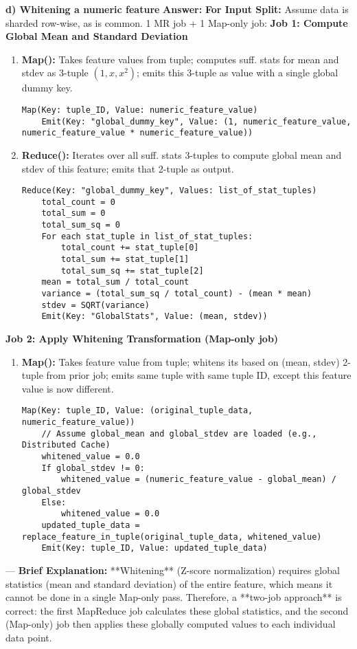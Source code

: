 \documentclass{article}
\begin{document}
\begin{enumerate}[label=\textbf{Question \arabic*.}]
  \textbf{d) Whitening a numeric feature}
    \textbf{Answer:}
    \textbf{For Input Split:} Assume data is sharded row-wise, as is common.
    1 MR job + 1 Map-only job:
    \textbf{Job 1: Compute Global Mean and Standard Deviation}
    \begin{enumerate}[label=(\alph*)]
    \item \textbf{Map():} Takes feature values from tuple; computes suff. stats for mean and stdev as 3-tuple $(1, x, x^2)$; emits this 3-tuple as value with a single global dummy key.
        \begin{lstlisting}
Map(Key: tuple_ID, Value: numeric_feature_value)
    Emit(Key: "global_dummy_key", Value: (1, numeric_feature_value, numeric_feature_value * numeric_feature_value))
        \end{lstlisting}
    \item \textbf{Reduce():} Iterates over all suff. stats 3-tuples to compute global mean and stdev of this feature; emits that 2-tuple as output.
        \begin{lstlisting}
Reduce(Key: "global_dummy_key", Values: list_of_stat_tuples)
    total_count = 0
    total_sum = 0
    total_sum_sq = 0
    For each stat_tuple in list_of_stat_tuples:
        total_count += stat_tuple[0]
        total_sum += stat_tuple[1]
        total_sum_sq += stat_tuple[2]
    mean = total_sum / total_count
    variance = (total_sum_sq / total_count) - (mean * mean)
    stdev = SQRT(variance)
    Emit(Key: "GlobalStats", Value: (mean, stdev))
        \end{lstlisting}
    \end{enumerate}
    \textbf{Job 2: Apply Whitening Transformation (Map-only job)}
    \begin{enumerate}[label=(\alph*)]
    \item \textbf{Map():} Takes feature value from tuple; whitens its based on (mean, stdev) 2-tuple from prior job; emits same tuple with same tuple ID, except this feature value is now different.
        \begin{lstlisting}
Map(Key: tuple_ID, Value: (original_tuple_data, numeric_feature_value))
    // Assume global_mean and global_stdev are loaded (e.g., Distributed Cache)
    whitened_value = 0.0
    If global_stdev != 0:
        whitened_value = (numeric_feature_value - global_mean) / global_stdev
    Else:
        whitened_value = 0.0
    updated_tuple_data = replace_feature_in_tuple(original_tuple_data, whitened_value)
    Emit(Key: tuple_ID, Value: updated_tuple_data)
        \end{lstlisting}
    \end{enumerate}
    ---
    \textbf{Brief Explanation:} **Whitening** (Z-score normalization) requires global statistics (mean and standard deviation) of the entire feature, which means it cannot be done in a single Map-only pass. Therefore, a **two-job approach** is correct: the first MapReduce job calculates these global statistics, and the second (Map-only) job then applies these globally computed values to each individual data point.


\end{enumerate}
\end{document}
